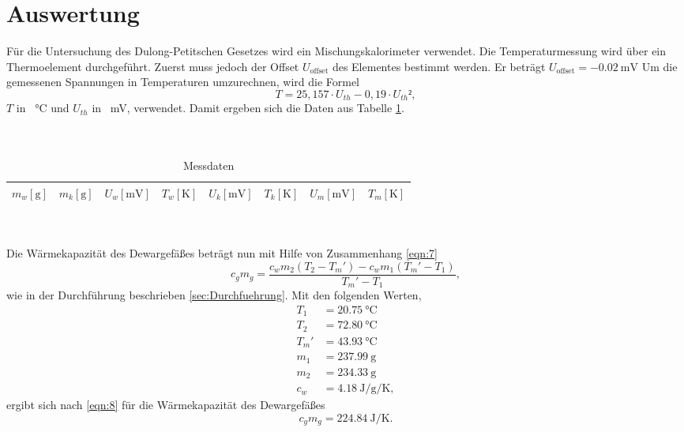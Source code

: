 \section{Auswertung}
\label{sec:Auswertung}

Für die Untersuchung des Dulong-Petitschen Gesetzes wird ein Mischungskalorimeter verwendet.
Die Temperaturmessung wird über ein Thermoelement durchgeführt.
Zuerst muss jedoch der Offset $U_{\text{offset}}$ des Elementes bestimmt werden.
Er beträgt $U_{\text{offset}}= \SI{-0,02}{\milli\volt}$
Um die gemessenen Spannungen in Temperaturen umzurechnen, wird die Formel
\begin{equation}
  T = 25,157 \cdot U_{th} - 0,19 \cdot U_{th}²,
\end{equation}
$T$ in \SI{}{\celsius} und $U_{th}$ in \SI{}{\milli\volt}, verwendet.
Damit ergeben sich die Daten aus Tabelle \ref{tab:1}. \\
\\
\\
\begin{table}
  \centering
  \caption{Messdaten}
  \label{tab:1}
  \begin{tabular}{c c c c c c c c}
    \toprule
    {$m_w [\si{\gram}]$} & {$m_k [\si{\gram}]$} & {$U_w [\si{\milli\volt}]$} & {$T_w [\si{\kelvin}]$} & {$U_k [\si{\milli\volt}]$} & {$T_k [\si{\kelvin}]$} & {$U_m [\si{\milli\volt}]$} & {$T_m [\si{\kelvin}]$} \\
    \midrule
    
    \bottomrule
  \end{tabular}
\end{table}
\\
\\
Die Wärmekapazität des Dewargefäßes beträgt nun mit Hilfe von Zusammenhang \ref{eqn:7}
\begin{equation}
  c_gm_g = \frac{c_wm_2(T_2-T_m')-c_wm_1(T_m'-T_1)}{T_m'-T_1},
  \label{eqn:8}
\end{equation}
wie in der Durchführung beschrieben \ref{sec:Durchfuehrung}.
Mit den folgenden Werten,
\begin{align}
  T_1 &= \SI{20,75}{\celsius} \\
  T_2 &= \SI{72,80}{\celsius} \\
  T_m'&= \SI{43,93}{\celsius} \\
  m_1 &= \SI{237,99}{\gram} \\
  m_2 &= \SI{234,33}{\gram} \\
  c_w &= \SI{4,18}{\joule\per\gram\per\kelvin},
\end{align}
ergibt sich nach \ref{eqn:8} für die Wärmekapazität des Dewargefäßes
\begin{equation}
  c_gm_g = \SI{224,84}{\joule\per\kelvin}.
\end{equation}

